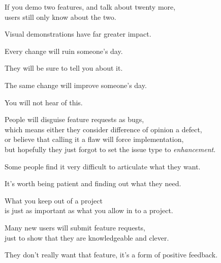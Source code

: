 \documentclass[t,aspectratio=169]{beamer}
\begin{document}
\begin{frame}[fragile]%
    \vfill
    If you demo two features, and talk about twenty more, \\
    users still only know about the two. \pause

    Visual demonstrations have far greater impact.
\end{frame}

\begin{frame}[fragile]%
    \vfill
    Every change will ruin someone's day.

    They will be sure to tell you about it. \pause

    The same change will improve someone's day.

    You will not hear of this.
\end{frame}

\begin{frame}[fragile]%
    \vfill
    People will disguise feature requests as bugs, \pause \\
    which means either they consider difference of opinion a defect, \pause \\
    or believe that calling it a flaw will force implementation, \pause \\
    but hopefully they just forgot to set the issue type to \textit{enhancement}.
\end{frame}

\begin{frame}[fragile]%
    \vfill
    Some people find it very difficult to articulate what they want. \pause

    It's worth being patient and finding out what they need.
\end{frame}

\begin{frame}[fragile]%
    \vfill
    What you keep out of a project \pause \\
    is just as important as what you allow in to a project.
\end{frame}

\begin{frame}[fragile]%
    \vfill
    Many new users will submit feature requests, \\
    just to show that they are knowledgeable and clever. \pause

    They don't really want that feature, it's a form of positive feedback.
\end{frame}
\end{document}
